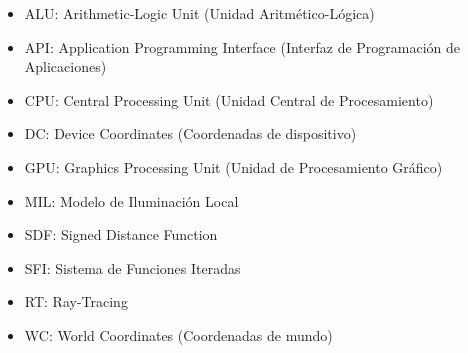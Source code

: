 \begin{itemize}
\item ALU: Arithmetic-Logic Unit (Unidad Aritmético-Lógica)
\item API: Application Programming Interface (Interfaz de Programación de Aplicaciones)
\item CPU: Central Processing Unit (Unidad Central de Procesamiento)
\item DC: Device Coordinates (Coordenadas de dispositivo)
\item GPU: Graphics Processing Unit (Unidad de Procesamiento Gráfico)
\item MIL: Modelo de Iluminación Local
\item SDF: Signed Distance Function
\item SFI: Sistema de Funciones Iteradas
\item RT: Ray-Tracing
\item WC: World Coordinates (Coordenadas de mundo)
\end{itemize}